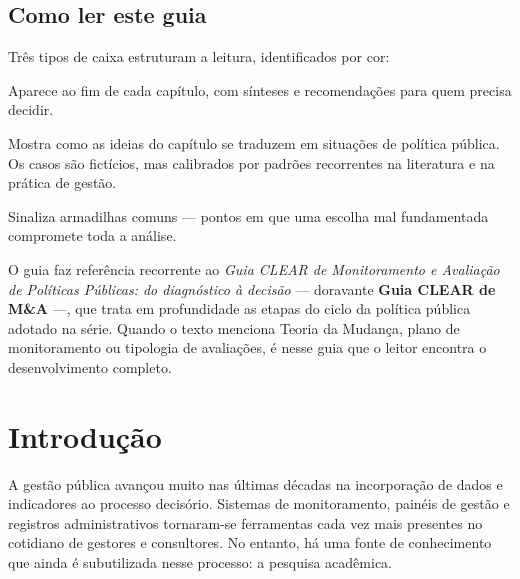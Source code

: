 \documentclass[12pt, a4paper, openany]{book}
\begin{document}
\section*{Como ler este guia}
Três tipos de caixa estruturam a leitura, identificados por cor:
\vspace{0.3cm}
\begin{notabox}
Aparece ao fim de cada capítulo, com sínteses e recomendações para quem
precisa decidir.
\end{notabox}
\begin{exemplobox}
Mostra como as ideias do capítulo se traduzem em situações de política
pública. Os casos são fictícios, mas calibrados por padrões recorrentes
na literatura e na prática de gestão.
\end{exemplobox}
\begin{atencaobox}
Sinaliza armadilhas comuns --- pontos em que uma escolha mal fundamentada
compromete toda a análise.
\end{atencaobox}
\vspace{0.5cm}
\noindent O guia faz referência recorrente ao \textit{Guia CLEAR de
Monitoramento e Avaliação de Políticas Públicas: do diagnóstico à decisão}
\citep{Lima2025} --- doravante \textbf{Guia CLEAR de M\&A} ---, que trata
em profundidade as etapas do ciclo da política pública adotado na série.
Quando o texto menciona Teoria da Mudança, plano de monitoramento ou
tipologia de avaliações, é nesse guia que o leitor encontra o
desenvolvimento completo.
\newpage

\tableofcontents

\mainmatter

\chapter*{Introdução}

A gestão pública avançou muito nas últimas décadas na incorporação de dados e
indicadores ao processo decisório. Sistemas de monitoramento, painéis de gestão
e registros administrativos tornaram-se ferramentas cada vez mais presentes no
cotidiano de gestores e consultores. No entanto, há uma fonte de conhecimento
que ainda é subutilizada nesse processo: a pesquisa acadêmica.
\end{document}
